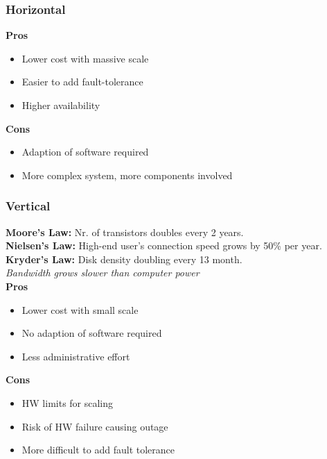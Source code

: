 \subsubsection{Horizontal}
\textbf{Pros}
\begin{itemize}
    \item Lower cost with massive scale
    \item Easier to add fault-tolerance
    \item Higher availability
\end{itemize}
\textbf{Cons}
\begin{itemize}
    \item Adaption of software required
    \item More complex system, more components involved
\end{itemize}

\subsubsection{Vertical}
\textbf{Moore's Law: }Nr. of transistors doubles every 2 years.\\
\textbf{Nielsen's Law:} High-end user's connection speed grows by 50\% per year.\\
\textbf{Kryder's Law:} Disk density doubling every 13 month.\\
\textit{Bandwidth grows slower than computer power}\\
\textbf{Pros}
\begin{itemize}
    \item Lower cost with small scale
    \item No adaption of software required
    \item Less administrative effort
\end{itemize}
\textbf{Cons}
\begin{itemize}
    \item HW limits for scaling
    \item Risk of HW failure causing outage
    \item More difficult to add fault tolerance
\end{itemize}

